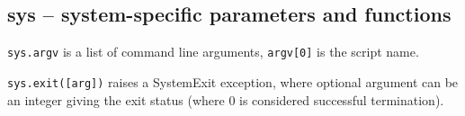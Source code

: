 %

\subsection{sys -- system-specific parameters and functions}

\texttt{sys.argv} is a list of command line arguments, \texttt{argv[0]} is the script name.

\texttt{sys.exit([arg])} raises a SystemExit exception, where optional argument can be an integer giving the exit status (where 0 is considered successful termination).

%